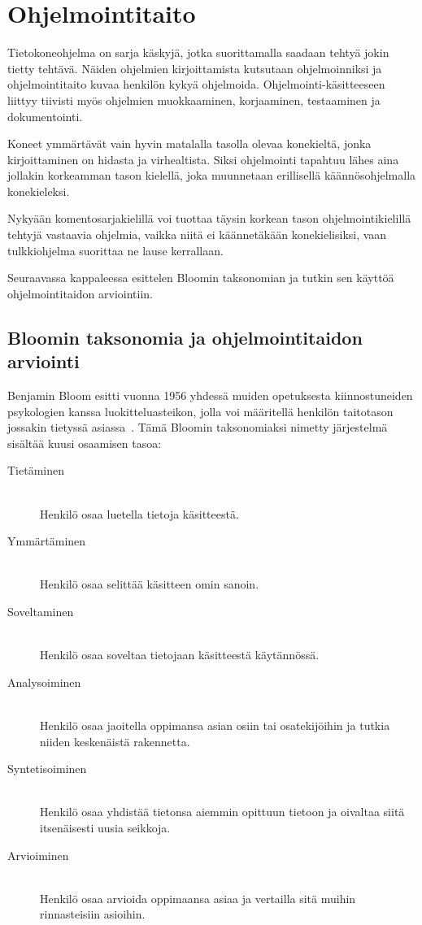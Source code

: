 \documentclass[finnish]{../tktltiki2}
\theoremstyle{definition}
\theoremstyle{remark}
\begin{document}
\section{Ohjelmointitaito}

Tietokoneohjelma on sarja käskyjä, jotka suorittamalla saadaan tehtyä jokin tietty tehtävä. Näiden ohjelmien kirjoittamista kutsutaan ohjelmoinniksi ja ohjelmointitaito kuvaa henkilön kykyä ohjelmoida. Ohjelmointi-käsitteeseen liittyy tiivisti myös ohjelmien muokkaaminen, korjaaminen, testaaminen ja dokumentointi.

Koneet ymmärtävät vain hyvin matalalla tasolla olevaa konekieltä, jonka kirjoittaminen on hidasta ja virhealtista. Siksi ohjelmointi tapahtuu lähes aina jollakin korkeamman tason kielellä, joka muunnetaan erillisellä käännösohjelmalla konekieleksi.

Nykyään komentosarjakielillä voi tuottaa täysin korkean tason ohjelmointikielillä tehtyjä vastaavia ohjelmia, vaikka niitä ei käännetäkään konekielisiksi, vaan tulkkiohjelma suorittaa ne lause kerrallaan.

Seuraavassa kappaleessa esittelen Bloomin taksonomian ja tutkin sen käyttöä ohjelmointitaidon arviointiin.

\subsection{Bloomin taksonomia ja ohjelmointitaidon arviointi}

Benjamin Bloom esitti vuonna 1956 yhdessä muiden opetuksesta kiinnostuneiden psykologien kanssa luokitteluasteikon, jolla voi määritellä henkilön taitotason jossakin tietyssä asiassa~\cite{BLOOM56}. Tämä Bloomin taksonomiaksi nimetty järjestelmä sisältää kuusi osaamisen tasoa:

\begin{description}
  \item[Tietäminen] \hfill \\
  Henkilö osaa luetella tietoja käsitteestä.
  \item[Ymmärtäminen] \hfill \\
  Henkilö osaa selittää käsitteen omin sanoin.
  \item[Soveltaminen] \hfill \\
  Henkilö osaa soveltaa tietojaan käsitteestä käytännössä.
  \item[Analysoiminen] \hfill \\
  Henkilö osaa jaoitella oppimansa asian osiin tai osatekijöihin ja tutkia niiden keskenäistä rakennetta.
  \item[Syntetisoiminen] \hfill \\
  Henkilö osaa yhdistää tietonsa aiemmin opittuun tietoon ja oivaltaa siitä itsenäisesti uusia seikkoja.
  \item[Arvioiminen] \hfill \\
  Henkilö osaa arvioida oppimaansa asiaa ja vertailla sitä muihin rinnasteisiin asioihin.
\end{description}
\end{document}
